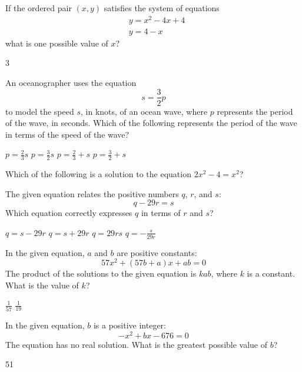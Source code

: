 \question[1]
If the ordered pair $(x,y)$ satisfies the system of equations
\[
  \begin{aligned}
    & y=x^{2}-4x+4 \\
    & y=4-x
  \end{aligned}
\]
what is one possible value of $x$?
\begin{solution}
3
\end{solution}



\newpage



\question[1]
An oceanographer uses the equation $$s=\frac{3}{2}p$$ to model the speed $s$, in knots, of an ocean wave, where $p$ represents the period of the wave, in seconds. Which of the following represents the period of the wave in terms of the speed of the wave?
\begin{choices}
  \CorrectChoice $p=\frac{2}{3}s$
  \choice $p=\frac{3}{2}s$
  \choice $p=\frac{2}{3}+s$
  \choice $p=\frac{3}{2}+s$
\end{choices}

\question[1]
Which of the following is a solution to the equation $2x^{2}-4=x^{2}$?
\begin{choices}
\end{choices}

\question[1]
The given equation relates the positive numbers $q$, $r$, and $s$:
\[
  q-29r=s
\]
Which equation correctly expresses $q$ in terms of $r$ and $s$?
\begin{choices}
  \choice $q=s-29r$
  \CorrectChoice $q=s+29r$
  \choice $q=29rs$
  \choice $q=-\frac{s}{29r}$
\end{choices}



\newpage



\question[1]
In the given equation, $a$ and $b$ are positive constants:
\[
  57x^{2}+(57b+a)x+ab=0
\]
The product of the solutions to the given equation is $kab$, where $k$ is a constant. What is the value of $k$?
\begin{choices}
  \CorrectChoice $\frac{1}{57}$
  \choice $\frac{1}{19}$
\end{choices}

\question[1]
In the given equation, $b$ is a positive integer:
\[
  -x^{2}+bx-676=0
\]
The equation has no real solution. What is the greatest possible value of $b$?
\begin{solution}
51
\end{solution}

